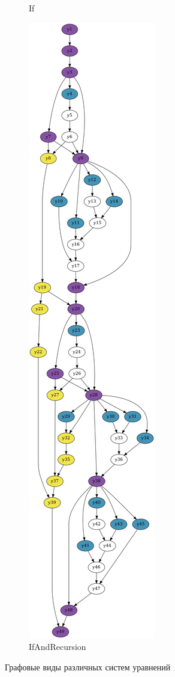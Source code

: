 \documentclass[../diploma.tex]{subfiles}
\begin{document}
\begin{figure}[htbp]
\begin{adjustwidth}{-2cm}{-2cm}
\begin{subfigure}{0.28\textwidth}
    \caption{If}
    \end{subfigure}
    \begin{subfigure}{0.28\textwidth}
      \centering
    \includegraphics[width=\textwidth]{graph_ifrec2.png}
    \caption{IfAndRecursion}
    \end{subfigure}
    \caption{Графовые виды различных систем уравнений}
    \label{all_graphs}
  \end{adjustwidth}
\end{figure}
\end{document}
